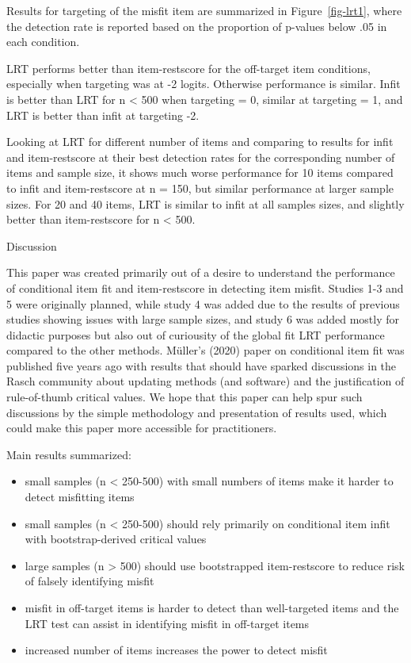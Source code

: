 \documentclass[
  letterpaper,
  DIV=11,
  numbers=noendperiod]{scrartcl}
\providecommand{\tightlist}{%
  \setlength{\itemsep}{0pt}\setlength{\parskip}{0pt}}\usepackage{longtable,booktabs,array}
\begin{document}
Results for targeting of the misfit item are summarized in
Figure~\ref{fig-lrt1}, where the detection rate is reported based on the
proportion of p-values below .05 in each condition.

LRT performs better than item-restscore for the off-target item
conditions, especially when targeting was at -2 logits. Otherwise
performance is similar. Infit is better than LRT for n \textless{} 500
when targeting = 0, similar at targeting = 1, and LRT is better than
infit at targeting -2.

Looking at LRT for different number of items and comparing to results
for infit and item-restscore at their best detection rates for the
corresponding number of items and sample size, it shows much worse
performance for 10 items compared to infit and item-restscore at n =
150, but similar performance at larger sample sizes. For 20 and 40
items, LRT is similar to infit at all samples sizes, and slightly better
than item-restscore for n \textless{} 500.

Discussion

This paper was created primarily out of a desire to understand the
performance of conditional item fit and item-restscore in detecting item
misfit. Studies 1-3 and 5 were originally planned, while study 4 was
added due to the results of previous studies showing issues with large
sample sizes, and study 6 was added mostly for didactic purposes but
also out of curiousity of the global fit LRT performance compared to the
other methods. Müller's (2020) paper on conditional item fit was
published five years ago with results that should have sparked
discussions in the Rasch community about updating methods (and software)
and the justification of rule-of-thumb critical values. We hope that
this paper can help spur such discussions by the simple methodology and
presentation of results used, which could make this paper more
accessible for practitioners.

Main results summarized:

\begin{itemize}
\tightlist
\item
  small samples (n \textless{} 250-500) with small numbers of items make
  it harder to detect misfitting items
\item
  small samples (n \textless{} 250-500) should rely primarily on
  conditional item infit with bootstrap-derived critical values
\item
  large samples (n \textgreater{} 500) should use bootstrapped
  item-restscore to reduce risk of falsely identifying misfit
\item
  misfit in off-target items is harder to detect than well-targeted
  items and the LRT test can assist in identifying misfit in off-target
  items
\item
  increased number of items increases the power to detect misfit
\end{itemize}
\end{document}
